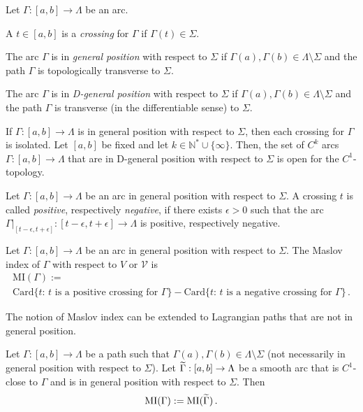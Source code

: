 \documentclass[AHL, Unicode, longabstracts, published]{cedram}
\newcommand*\cV{\mathcal{V}}
\newcommand{\MI}{\mathrm{MI}}
\newcommand{\rCard}{\mathrm{Card}}
\newcommand*\N{\mathbb{N}}
\let\oldtilde\tilde
\renewcommand*{\tilde}[1]{\mathchoice{\widetilde{#1}}{\widetilde{#1}}{\oldtilde{#1}}{\oldtilde{#1}}}
\begin{document}
\begin{defi}
Let $\Gamma:[a, b]\rightarrow \Lambda$ be an arc.
\begin{itemize}
\item A $t\in[a,b]$ is a {\sl crossing} for $\Gamma$ if $\Gamma(t)\in\Sigma$.
\item The arc $ \Gamma$ is in {\sl general position} with respect to $\Sigma$ if $\Gamma(a),\Gamma(b)\in\Lambda\setminus\Sigma$ and the path $\Gamma$ is { topologically} transverse to $\Sigma$. {
\item The arc $ \Gamma$ is in {\sl D-general position} with respect to $\Sigma$ if $\Gamma(a),\Gamma(b)\in\Lambda\setminus\Sigma$ and the path $\Gamma$ is transverse (in the differentiable sense) to $\Sigma$.}
\end{itemize}
\end{defi}

\begin{rema}
If $\Gamma:[a,b]\to\Lambda$ is in general position with respect to $\Sigma$, then each crossing for $\Gamma$ is isolated. {Let $[a, b]$ be fixed and let $k\in\N^*\cup\{ \infty\}$. Then, the set of $C^k$ arcs $\Gamma:[a, b]\to \Lambda$ that are in D-general position with respect to $\Sigma$ is open for the $C^1$-topology.}
\end{rema}

Let $\Gamma:[a,b]\to\Lambda$ be an arc in general position with respect to $\Sigma$. A crossing $t$ is called \emph{positive}, respectively \emph{negative}, if there exists $\epsilon>0$ such that the arc $\Gamma\vert_{[t-\epsilon, t+\epsilon]}:[t-\epsilon, t+\epsilon]\to\Lambda$ is positive, respectively negative.



\begin{defi}\label{defi MI for arc}
Let $\Gamma:[a,b]\to\Lambda$ be an arc in general position with respect to $\Sigma$. The Maslov index of $\Gamma$ with respect to {$V$ or $\cV$} is
\begin{multline*}
\MI(\Gamma) :=
\\
\rCard\{t :\, t\text{ is a positive crossing for }\Gamma\}-\rCard\{t:\, t \text{ is a negative crossing for }\Gamma\}\,.
\end{multline*}
\end{defi}

The notion of Maslov index can be extended to Lagrangian paths that are not in general position.
\begin{defi}
Let $\Gamma:[a,b]\to\Lambda$ be a path such that $\Gamma(a),\Gamma(b)\in\Lambda\setminus\Sigma$ (not necessarily in general position with respect to $\Sigma$). Let { $\tilde\Gamma:[a,b]\to \Lambda$ be a smooth arc that is $C^1$-close to $\Gamma$ and is in general position with respect to $\Sigma$. } Then
\[
\MI(\Gamma):=\MI(\tilde\Gamma)\,.
\]
\end{defi}
\end{document}
